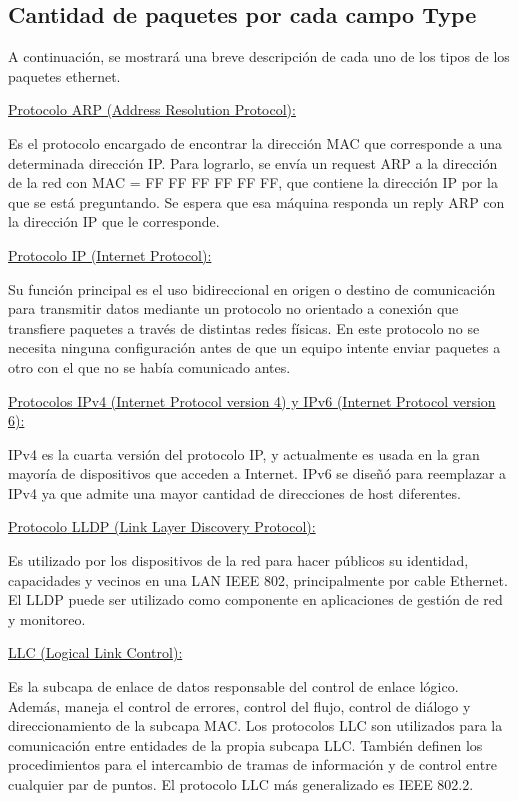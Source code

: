 \subsection{Cantidad de paquetes por cada campo Type}

A continuación, se mostrará una breve descripción de cada uno de los tipos de los paquetes ethernet.

\underline{Protocolo ARP (Address Resolution Protocol):}

Es el protocolo encargado de encontrar la dirección MAC que corresponde a una determinada dirección IP. Para lograrlo, se envía un request ARP a la dirección de la red con MAC = FF FF FF FF FF FF, que contiene la dirección IP por la que se está preguntando. Se espera que esa máquina responda un reply ARP con la dirección IP que le corresponde.

\underline{Protocolo IP (Internet Protocol):}

Su función principal es el uso bidireccional en origen o destino de comunicación para transmitir datos mediante un protocolo no orientado a conexión que transfiere paquetes a través de distintas redes físicas.
En este protocolo no se necesita ninguna configuración antes de que un equipo intente enviar paquetes a otro con el que no se había comunicado antes.

\underline{Protocolos IPv4 (Internet Protocol version 4) y IPv6 (Internet Protocol version 6):}

IPv4 es la cuarta versión del protocolo IP, y actualmente es usada en la gran mayoría de dispositivos que acceden a Internet. IPv6 se diseñó para reemplazar a IPv4 ya que admite una mayor cantidad de direcciones de host diferentes.

\underline{Protocolo LLDP (Link Layer Discovery Protocol):}

Es utilizado por los dispositivos de la red para hacer públicos su identidad, capacidades y vecinos en una LAN IEEE 802, principalmente por cable Ethernet.
El LLDP puede ser utilizado como componente en aplicaciones de gestión de red y monitoreo.
	
\underline{LLC (Logical Link Control):}

Es la subcapa de enlace de datos responsable del control de enlace lógico. Además, maneja el control de errores, control del flujo, control de diálogo y direccionamiento de la subcapa MAC.
Los protocolos LLC son utilizados para la comunicación entre entidades de la propia subcapa LLC. También definen los procedimientos para el intercambio de tramas de información y de control entre cualquier par de puntos. 
El protocolo LLC más generalizado es IEEE 802.2.



